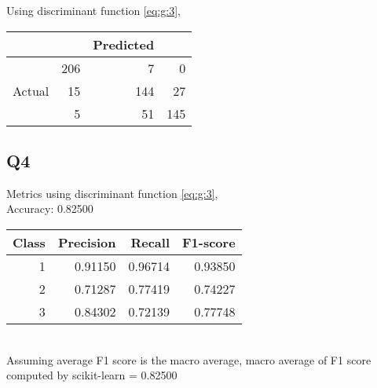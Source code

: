 \documentclass{subfiles}
\begin{document}
  Using discriminant function \ref{eq:g:3},
  \begin{tabular}{|r|r|r|r|}
    \hline
    & & Predicted & \\
    \hline
    & 206 & 7 & 0\\
    \hline
    Actual & 15 & 144 & 27\\
    \hline
    & 5 & 51 & 145\\
    \hline
  \end{tabular}\cite{scikit-learn}
  \subsection{Q4}
  Metrics using discriminant function \ref{eq:g:3},\\
  Accuracy: 0.82500\cite{scikit-learn}\\
  \begin{tabular}{|r|r|r|r|}
    \hline
    Class & Precision & Recall & F1-score\\
    \hline
    1 & 0.91150 & 0.96714 & 0.93850\\
    \hline
    2 & 0.71287 & 0.77419 & 0.74227\\
    \hline
    3 & 0.84302 & 0.72139 & 0.77748\\
    \hline
  \end{tabular}\cite{scikit-learn}\\
  Assuming average F1 score is the macro average, macro average of F1 score computed by scikit-learn = 0.82500\cite{scikit-learn}
\end{document}
